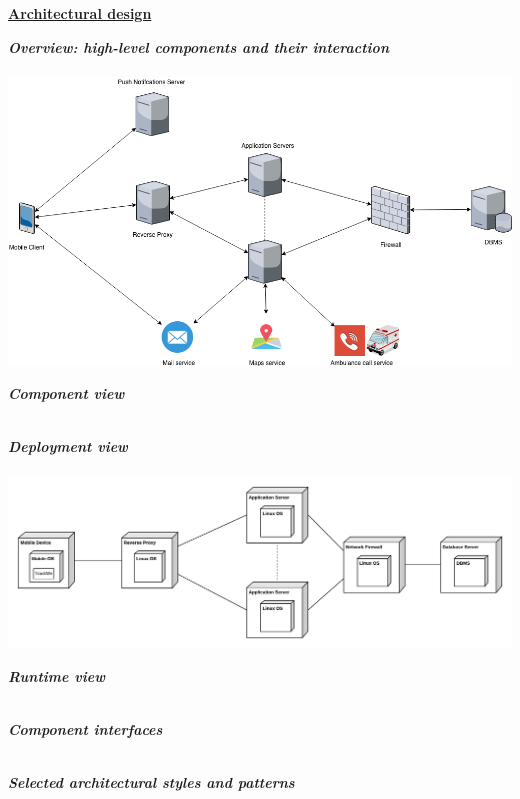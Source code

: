 	\underline{\textbf{Architectural design} }
	\begin{legal}
    		\item \textit{\textbf{Overview: high-level components and their interaction}}\\\\
		\includegraphics[width=\linewidth]{../images/OverviewDiagram.png}
		\item \textit{\textbf{Component view}}\\\\
		\item \textit{\textbf{Deployment view}}\\\\
		\includegraphics[width=\linewidth]{../images/DeploymentDiagram.png}
		\item \textit{\textbf{Runtime view}}\\\\
		\item \textit{\textbf{Component interfaces}}\\\\
		\item \textit{\textbf{Selected architectural styles and patterns}}\\\\
  	\end{legal}
